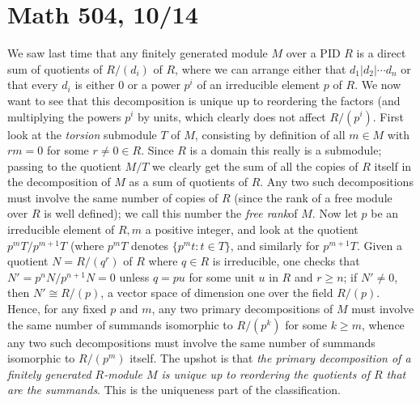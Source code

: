 \documentclass[10pt]{article}
\begin{document}
\section*{Math 504, 10/14}

We saw last time that any finitely generated module $M$ over a PID $R$
is a direct sum of quotients of $R/(d_i)$ of $R$, where we can arrange
either that $d_1 | d_2 | \cdots d_n$ or that every $d_i$ is either 0 or
a power $p^i$ of an irreducible element $p$ of $R$. We now want to see
that this decomposition is unique up to reordering the factors (and
multiplying the powers $p^i$ by units, which clearly does not affect
$R/(p^i)$. First look at the {\sl torsion} submodule $T$ of $M$,
consisting by definition of all $m\in M$ with $rm = 0 $ for some
$r\ne0\in R$. Since $R$ is a domain this really is a submodule; passing
to the quotient $M/T$ we clearly get the sum of all the copies of $R$
itself in the decomposition of $M$ as a sum of quotients of $R$. Any two
such decompositions must involve the same number of copies of $R$ (since
the rank of a free module over $R$ is well defined); we call this number
the {\sl free rank}of $M$. Now let $p$ be an irreducible element of $R,
m$ a positive integer, and look at the quotient $p^m T/p^{m+1}T$ (where
$p^m T$ denotes $\{p^m t: t\in T\}$, and similarly for $p^{m+1} T$.
Given a quotient $N = R/(q^r)$ of $R$ where $q\in R$ is irreducible, one
checks that $N'=p^n N/p^{n+1} N = 0$ unless $q = pu$ for some unit $u$
in $R$ and $r\ge n$; if $N'\ne0$, then $N'\cong R/(p)$, a vector space
of dimension one over the field $R/(p)$. Hence, for any fixed $p$ and
$m$, any two primary decompositions of $M$ must involve the same number
of summands isomorphic to $R/(p^k)$ for some $k\ge m$, whence any two
such decompositions must involve the same number of summands isomorphic
to $R/(p^m)$ itself. The upshot is that {\sl the primary decomposition
  of a finitely generated $R$-module $M$ is unique up to reordering the
  quotients of $R$ that are the summands}. This is the uniqueness part
of the classification.
\end{document}
